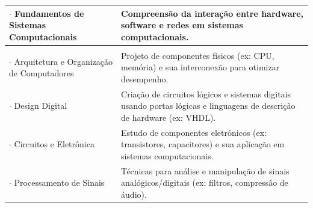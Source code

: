 \begin{table}[h]
\begin{tabular}{|m{5.5cm}|m{8.5cm}|}
    \hline
    \cellcolor{AmareloVivo} $\cdot$ Fundamentos de Sistemas Computacionais & Compreensão da interação entre hardware, software e redes em sistemas computacionais. \\
    \hline
    \rowcolor{AzulClaro} \multicolumn{2}{|l|}{\textcolor{white}{\textbf{6. Hardware}}} \\
    \hline
    \cellcolor{AmareloVivo} $\cdot$ Arquitetura e Organização de Computadores & Projeto de componentes físicos (ex: CPU, memória) e sua interconexão para otimizar desempenho. \\
    \hline
    \cellcolor{AmareloVivo} $\cdot$ Design Digital & Criação de circuitos lógicos e sistemas digitais usando portas lógicas e linguagens de descrição de hardware (ex: VHDL). \\
    \hline
    \cellcolor{AmareloVivo} $\cdot$ Circuitos e Eletrônica & Estudo de componentes eletrônicos (ex: transistores, capacitores) e sua aplicação em sistemas computacionais. \\
    \hline
    \cellcolor{AmareloVivo} $\cdot$ Processamento de Sinais & Técnicas para análise e manipulação de sinais analógicos/digitais (ex: filtros, compressão de áudio). \\
    \hline
    \end{tabular}
\end{table}


